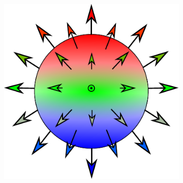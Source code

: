 \begin{figure}[h!]
\centering
\begin{subfigure}{.5\textwidth}
  \centering
  \includegraphics[width=1.0\linewidth]{Figures/HedgehogSphere}
  \caption{}
\end{subfigure}%
\hspace{1cm}
\begin{subfigure}{.35\textwidth}
  \centering

\end{subfigure}
\end{figure}
